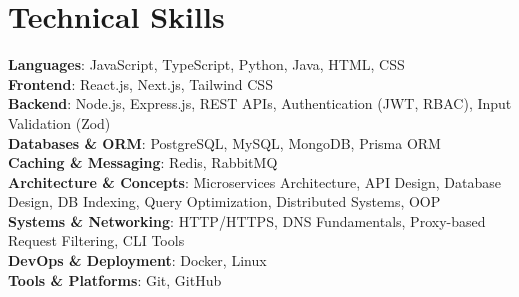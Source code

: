 \documentclass[letterpaper,11pt]{article}
\begin{document}
\section{Technical Skills}
\begin{itemize}[leftmargin=0.15in, label={}]
\small{\item{
\textbf{Languages}{: JavaScript, TypeScript, Python, Java, HTML, CSS} \\

\textbf{Frontend}{: React.js, Next.js, Tailwind CSS} \\

\textbf{Backend}{: Node.js, Express.js, REST APIs, Authentication (JWT, RBAC), Input Validation (Zod)} \\

\textbf{Databases \& ORM}{: PostgreSQL, MySQL, MongoDB, Prisma ORM} \\

\textbf{Caching \& Messaging}{: Redis, RabbitMQ} \\

\textbf{Architecture \& Concepts}{: Microservices Architecture, API Design, Database Design, DB Indexing, Query Optimization, Distributed Systems, OOP} \\

\textbf{Systems \& Networking}{: HTTP/HTTPS, DNS Fundamentals, Proxy-based Request Filtering, CLI Tools} \\

\textbf{DevOps \& Deployment}{: Docker, Linux} \\

\textbf{Tools \& Platforms}{: Git, GitHub}
}}
\end{itemize}





\end{document}
